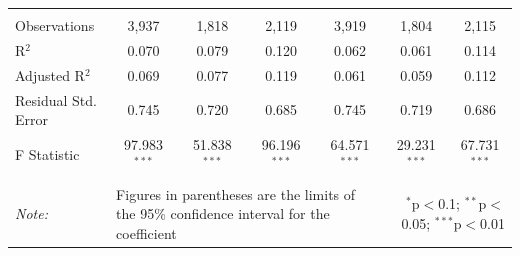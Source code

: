 \documentclass[alpha-refs]{wiley-article-01g}
\begin{document}
\begin{landscape}
\begin{table}[!htbp]
\begin{tabular}{@{\extracolsep{5pt}}lcccccc}
  & & & & & & \\ 
\hline \\[-3ex] 
Observations & 3,937 & 1,818 & 2,119 & 3,919 & 1,804 & 2,115 \\ 
R$^{2}$ & 0.070 & 0.079 & 0.120 & 0.062 & 0.061 & 0.114 \\ 
Adjusted R$^{2}$ & 0.069 & 0.077 & 0.119 & 0.061 & 0.059 & 0.112 \\ 
Residual Std. Error & 0.745 & 0.720 & 0.685 & 0.745 & 0.719 & 0.686 \\ 
F Statistic & 97.983$^{***}$ & 51.838$^{***}$ & 96.196$^{***}$ & 64.571$^{***}$ & 29.231$^{***}$ & 67.731$^{***}$ \\ 
\hline 
\hline \\[-3ex] 
\textit{Note:} &\multicolumn{4}{l}{Figures in parentheses are the limits of the 95\% confidence interval for the coefficient}  & \multicolumn{2}{r}{$^{*}$p$<$0.1; $^{**}$p$<$0.05; $^{***}$p$<$0.01} \\ 
\end{tabular} 
\end{table} 

\end{landscape}

\newpage
\end{document}
